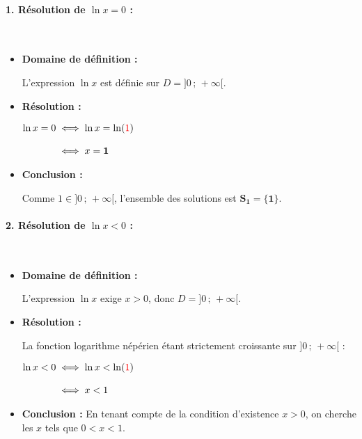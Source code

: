 \documentclass[12pt,a4paper]{article}
\begin{document}
\begin{tcolorbox}[colback=gray!5!white,colframe=myblue,title=\textbf{Correction détaillée}]

\paragraph{1. Résolution de $\ln x = 0$ :}\leavevmode\\[2mm]
\begin{itemize}
    \item \textbf{Domaine de définition :} 
    
    L'expression $\ln x$ est définie sur $D = ]0 \,;\, +\infty[$.
    \item \textbf{Résolution :}
    
    $
    \begin{aligned}
    \ln x = 0 &\iff \ln x = \ln({\color{red}1})\\[3mm]
            &\iff x = \mathbf{1}
    \end{aligned}
    $
    \item \textbf{Conclusion :} 
    
    Comme $1 \in ]0 \,;\, +\infty[$, l'ensemble des solutions est $\mathbf{S_1 = \{1\}}$.
\end{itemize}

\vspace{0.4cm}

\paragraph{2. Résolution de $\ln x < 0$ :}\leavevmode\\[2mm]
\begin{itemize}
    \item \textbf{Domaine de définition :} 
    
    L'expression $\ln x$ exige $x > 0$, donc $D = ]0 \,;\, +\infty[$.
    \item \textbf{Résolution :} 
    
    La fonction logarithme népérien étant strictement croissante sur $]0 \,;\, +\infty[$ :
    
    $
    \begin{aligned}
    \ln x < 0 &\iff \ln x < \ln({\color{red}1})\\[3mm]
              &\iff x < 1
    \end{aligned}
    $
    \item \textbf{Conclusion :} En tenant compte de la condition d'existence $x > 0$, on cherche les $x$ tels que $0 < x < 1$. 
    

\end{itemize}
\end{tcolorbox}
\end{document}
